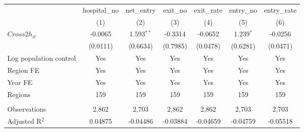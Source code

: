\begingroup
\centering
\begin{tabular}{lcccccc}
   \toprule
                          & hospital\_no  & net\_entry   & exit\_no  & exit\_rate  & entry\_no   & entry\_rate \\    
                          & (1)           & (2)          & (3)       & (4)         & (5)         & (6)\\  
   \midrule 
   $Cross2h_{it}$         & -0.0065       & 1.593$^{**}$ & -0.3314   & -0.0652     & 1.239$^{*}$ & -0.0256\\   
                          & (0.0111)      & (0.6634)     & (0.7985)  & (0.0478)    & (0.6281)    & (0.0471)\\   
   Log population control & Yes           & Yes          & Yes       & Yes         & Yes         & Yes\\  
   Region FE              & Yes           & Yes          & Yes       & Yes         & Yes         & Yes\\  
   Year FE                & Yes           & Yes          & Yes       & Yes         & Yes         & Yes\\  
   Regions                & 159           & 159          & 159       & 159         & 159         & 159\\  
    \\
   Observations           & 2,862         & 2,703        & 2,862     & 2,862       & 2,703       & 2,703\\  
   Adjusted R$^2$         & 0.04875       & -0.04486     & -0.03884  & -0.04659    & -0.04759    & -0.05518\\  
   \bottomrule
\end{tabular}
\par\endgroup
